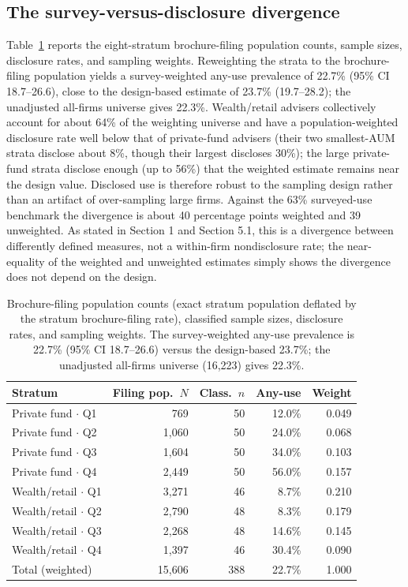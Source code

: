 \documentclass[utf8]{FrontiersinHarvard} %
\begin{document}
\subsection{The survey-versus-disclosure divergence}
Table~\ref{tab:weighting} reports the eight-stratum brochure-filing population counts, sample sizes, disclosure rates, and sampling weights. Reweighting the strata to the brochure-filing population yields a survey-weighted any-use prevalence of 22.7\% (95\% CI 18.7--26.6), close to the design-based estimate of 23.7\% (19.7--28.2); the unadjusted all-firms universe gives 22.3\%. Wealth/retail advisers collectively account for about 64\% of the weighting universe and have a population-weighted disclosure rate well below that of private-fund advisers (their two smallest-AUM strata disclose about 8\%, though their largest discloses 30\%); the large private-fund strata disclose enough (up to 56\%) that the weighted estimate remains near the design value. Disclosed use is therefore robust to the sampling design rather than an artifact of over-sampling large firms. Against the 63\% surveyed-use benchmark the divergence is about 40 percentage points weighted and 39 unweighted. As stated in Section 1 and Section 5.1, this is a divergence between differently defined measures, not a within-firm nondisclosure rate; the near-equality of the weighted and unweighted estimates simply shows the divergence does not depend on the design.

\begin{table}[!ht]
\caption{Brochure-filing population counts (exact stratum population deflated by the stratum brochure-filing rate), classified sample sizes, disclosure rates, and sampling weights. The survey-weighted any-use prevalence is 22.7\% (95\% CI 18.7--26.6) versus the design-based 23.7\%; the unadjusted all-firms universe (16{,}223) gives 22.3\%.}
\label{tab:weighting}
\centering
\begin{tabular}{lrrrr}
\toprule
Stratum & Filing pop.\ $N$ & Class.\ $n$ & Any-use & Weight \\
\midrule
Private fund $\cdot$ Q1 & 769 & 50 & 12.0\% & 0.049 \\
Private fund $\cdot$ Q2 & 1{,}060 & 50 & 24.0\% & 0.068 \\
Private fund $\cdot$ Q3 & 1{,}604 & 50 & 34.0\% & 0.103 \\
Private fund $\cdot$ Q4 & 2{,}449 & 50 & 56.0\% & 0.157 \\
Wealth/retail $\cdot$ Q1 & 3{,}271 & 46 & 8.7\% & 0.210 \\
Wealth/retail $\cdot$ Q2 & 2{,}790 & 48 & 8.3\% & 0.179 \\
Wealth/retail $\cdot$ Q3 & 2{,}268 & 48 & 14.6\% & 0.145 \\
Wealth/retail $\cdot$ Q4 & 1{,}397 & 46 & 30.4\% & 0.090 \\
Total (weighted) & 15{,}606 & 388 & 22.7\% & 1.000 \\
\bottomrule
\end{tabular}
\end{table}
\end{document}
